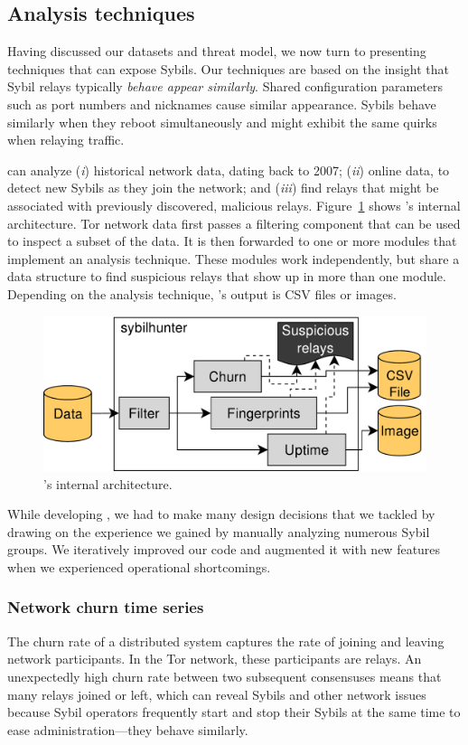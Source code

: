 \subsection{Analysis techniques}
\label{sec:techniques}
Having discussed our datasets and threat model, we now turn to presenting
techniques that can expose Sybils.  Our techniques are based on the insight that
Sybil relays typically \emph{behave appear similarly}.  Shared configuration
parameters such as port numbers and nicknames cause similar appearance.  Sybils
behave similarly when they reboot simultaneously and might exhibit the same
quirks when relaying traffic.

\Sys can analyze (\emph{i}) historical network data, dating back to 2007;
(\emph{ii}) online data, to detect new Sybils as they join the network; and
(\emph{iii}) find relays that might be associated with previously discovered,
malicious relays.  Figure~\ref{fig:shr-internal} shows \sys's internal
architecture.  Tor network data first passes a filtering component that can be
used to inspect a subset of the data.  It is then forwarded to one or more
modules that implement an analysis technique.  These modules work independently,
but share a data structure to find suspicious relays that show up in more than
one module.  Depending on the analysis technique, \sys's output is CSV
files or images.

\begin{figure}[t]
	\centering
	\includegraphics[width=0.9\linewidth]{diagrams/sybilhunter-internal.pdf}
	\caption{\Sys's internal architecture.}
	\label{fig:shr-internal}
\end{figure}

While developing \sys, we had to make many design decisions that we
tackled by drawing on the experience we gained by manually analyzing numerous
Sybil groups.  We iteratively improved our code and augmented it with new
features when we experienced operational shortcomings.

\subsubsection{Network churn time series}
\label{sec:churn-time-series}
The churn rate of a distributed system captures the rate of joining and leaving
network participants.  In the Tor network, these participants are relays.  An
unexpectedly high churn rate between two subsequent consensuses means that many
relays joined or left, which can reveal Sybils and other network issues because
Sybil operators frequently start and stop their Sybils at the same time to ease
administration---they behave similarly.

